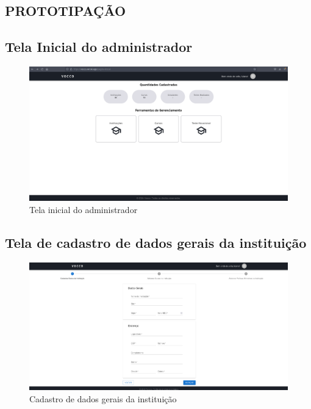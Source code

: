 
\begin{apendicesenv}

\partapendices

\chapter{PROTOTIPAÇÃO}
\label{apendice_a}

\section{Tela Inicial do administrador}
\begin{figure}[H]
    \centering
    \includegraphics[width=1.0\linewidth]{images/telaInicial.png}
    \caption{Tela inicial do administrador}
    \label{fig:tela-inicial}
\end{figure}

\section{Tela de cadastro de dados gerais da instituição}
\begin{figure}[H]
    \centering
    \includegraphics[width=1.0\linewidth]{images/dadosGerais.png}
    \caption{Cadastro de dados gerais da instituição}
    \label{fig:dados-gerais}
\end{figure}


\end{apendicesenv}

